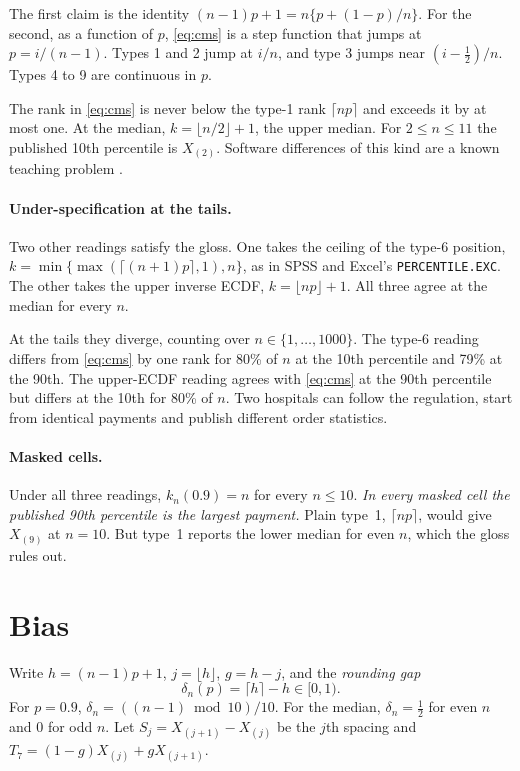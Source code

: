 \documentclass[11pt]{article}
\theoremstyle{remark}
\newcommand{\ceil}[1]{\lceil #1 \rceil}
\newcommand{\floor}[1]{\lfloor #1 \rfloor}
\begin{document}
The first claim is the identity $(n-1)p+1=n\{p+(1-p)/n\}$. For the second, as a function of $p$, \eqref{eq:cms} is a step function that jumps at $p=i/(n-1)$. Types 1 and 2 jump at $i/n$, and type 3 jumps near $(i-\tfrac12)/n$. Types 4 to 9 are continuous in $p$.

The rank in \eqref{eq:cms} is never below the type-1 rank $\ceil{np}$ and exceeds it by at most one. At the median, $k=\floor{n/2}+1$, the upper median. For $2\le n\le 11$ the published 10th percentile is $X_{(2)}$. Software differences of this kind are a known teaching problem \citep{langford2006}.

\paragraph{Under-specification at the tails.} Two other readings satisfy the gloss. One takes the ceiling of the type-6 position, $k=\min\{\max(\ceil{(n+1)p},1),n\}$, as in SPSS and Excel's \texttt{PERCENTILE.EXC}. The other takes the upper inverse ECDF, $k=\floor{np}+1$. All three agree at the median for every $n$.

At the tails they diverge, counting over $n\in\{1,\dots,1000\}$. The type-6 reading differs from \eqref{eq:cms} by one rank for 80\% of $n$ at the 10th percentile and 79\% at the 90th. The upper-ECDF reading agrees with \eqref{eq:cms} at the 90th percentile but differs at the 10th for 80\% of $n$. Two hospitals can follow the regulation, start from identical payments and publish different order statistics.

\paragraph{Masked cells.} Under all three readings, $k_n(0.9)=n$ for every $n\le10$. \emph{In every masked cell the published 90th percentile is the largest payment.} Plain type~1, $\ceil{np}$, would give $X_{(9)}$ at $n=10$. But type~1 reports the lower median for even $n$, which the gloss rules out.

\section{Bias}\label{sec:bias}

Write $h=(n-1)p+1$, $j=\floor{h}$, $g=h-j$, and the \emph{rounding gap}
\[
\delta_n(p)=\ceil{h}-h\in[0,1).
\]
For $p=0.9$, $\delta_n=((n-1)\bmod 10)/10$. For the median, $\delta_n=\tfrac12$ for even $n$ and $0$ for odd $n$. Let $S_j=X_{(j+1)}-X_{(j)}$ be the $j$th spacing and $T_7=(1-g)X_{(j)}+gX_{(j+1)}$.
\end{document}
